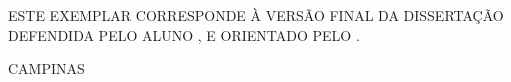 {\begin{emptyenv}
\begin{center}
        \begin{flushleft}
            \parbox{3in}{
            ESTE EXEMPLAR CORRESPONDE À VERSÃO FINAL DA DISSERTAÇÃO DEFENDIDA PELO ALUNO \MakeUppercase{\Wauthor}, E ORIENTADO PELO \MakeUppercase{\Wsupervisor}.
            }
        \end{flushleft}
        \vspace*{\fill}
        CAMPINAS\\
        \Wdegreeyear

    \end{center}
\end{emptyenv}
}


